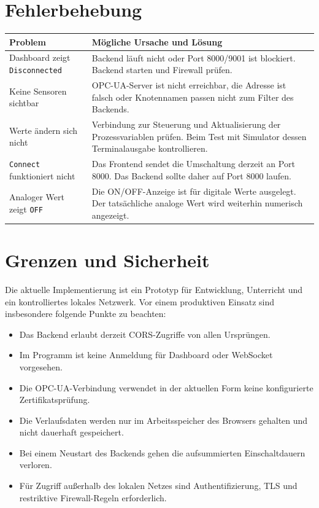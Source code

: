 \documentclass[11pt,a4paper,parskip=half]{scrartcl}
\newcommand{\code}[1]{\texttt{#1}}
\begin{document}
\section{Fehlerbehebung}

\begin{tabularx}{\textwidth}{@{}p{4.4cm}X@{}}
  \toprule
  \textbf{Problem} & \textbf{Mögliche Ursache und Lösung}\\
  \midrule
  Dashboard zeigt \code{Disconnected} & Backend läuft nicht oder Port 8000/9001 ist blockiert. Backend starten und Firewall prüfen.\\
  Keine Sensoren sichtbar & OPC-UA-Server ist nicht erreichbar, die Adresse ist falsch oder Knotennamen passen nicht zum Filter des Backends.\\
  Werte ändern sich nicht & Verbindung zur Steuerung und Aktualisierung der Prozessvariablen prüfen. Beim Test mit Simulator dessen Terminalausgabe kontrollieren.\\
  \code{Connect} funktioniert nicht & Das Frontend sendet die Umschaltung derzeit an Port 8000. Das Backend sollte daher auf Port 8000 laufen.\\
  Analoger Wert zeigt \code{OFF} & Die ON/OFF-Anzeige ist für digitale Werte ausgelegt. Der tatsächliche analoge Wert wird weiterhin numerisch angezeigt.\\
  \bottomrule
\end{tabularx}

\section{Grenzen und Sicherheit}

Die aktuelle Implementierung ist ein Prototyp für Entwicklung, Unterricht und ein kontrolliertes lokales Netzwerk. Vor einem produktiven Einsatz sind insbesondere folgende Punkte zu beachten:

\begin{itemize}
  \item Das Backend erlaubt derzeit CORS-Zugriffe von allen Ursprüngen.
  \item Im Programm ist keine Anmeldung für Dashboard oder WebSocket vorgesehen.
  \item Die OPC-UA-Verbindung verwendet in der aktuellen Form keine konfigurierte Zertifikatsprüfung.
  \item Die Verlaufsdaten werden nur im Arbeitsspeicher des Browsers gehalten und nicht dauerhaft gespeichert.
  \item Bei einem Neustart des Backends gehen die aufsummierten Einschaltdauern verloren.
  \item Für Zugriff außerhalb des lokalen Netzes sind Authentifizierung, TLS und restriktive Firewall-Regeln erforderlich.
\end{itemize}
\end{document}
